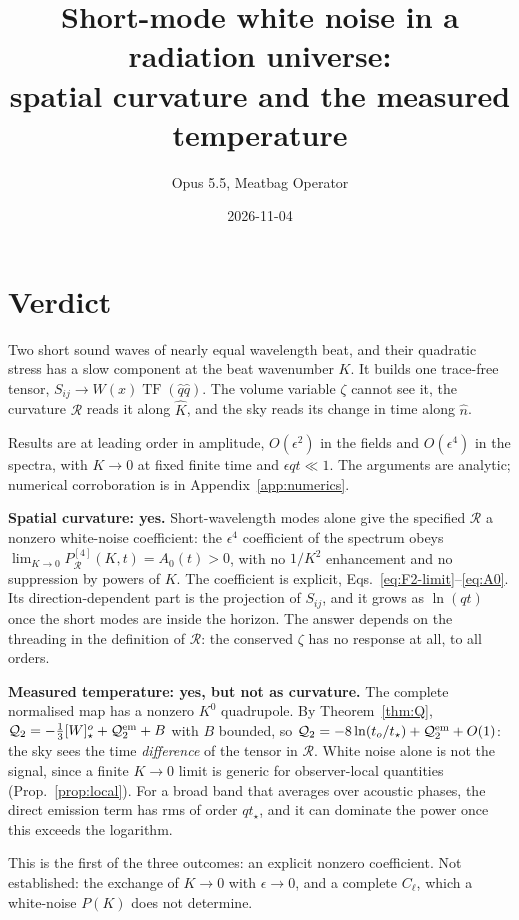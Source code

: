 \documentclass[10pt]{article}
\title{Short-mode white noise in a radiation universe:\\ spatial curvature and the measured temperature}
\author{Opus 5.5, Meatbag Operator}
\date{2026-11-04}
\newcommand{\eps}{\epsilon}
\newcommand{\nh}{\hat n}
\newcommand{\TF}{\operatorname{TF}}
\newcommand{\Q}{\mathcal Q_2}
\newcommand{\R}{\mathcal R}
\newcommand{\Kh}{\hat K}
\newcommand{\qh}{\hat q}
\begin{document}
\maketitle

\section*{Verdict}

Two short sound waves of nearly equal wavelength beat, and their quadratic stress has a slow component at the beat wavenumber $K$. It builds one trace-free tensor, $S_{ij}\to W(x)\TF(\qh\qh)$. The volume variable $\zeta$ cannot see it, the curvature $\R$ reads it along $\Kh$, and the sky reads its change in time along $\nh$.

Results are at leading order in amplitude, $O(\eps^2)$ in the fields and $O(\eps^4)$ in the spectra, with $K\to0$ at fixed finite time and $\eps qt\ll1$. The arguments are analytic; numerical corroboration is in Appendix~\ref{app:numerics}.

\textbf{Spatial curvature: yes.} Short-wavelength modes alone give the specified $\R$ a nonzero white-noise coefficient: the $\eps^4$ coefficient of the spectrum obeys $\lim_{K\to0}P_\R^{[4]}(K,t)=A_0(t)>0$, with no $1/K^2$ enhancement and no suppression by powers of $K$. The coefficient is explicit, Eqs.~\eqref{eq:F2-limit}--\eqref{eq:A0}. Its direction-dependent part is the projection of $S_{ij}$, and it grows as $\ln(qt)$ once the short modes are inside the horizon. The answer depends on the threading in the definition of $\R$: the conserved $\zeta$ has no response at all, to all orders.

\textbf{Measured temperature: yes, but not as curvature.} The complete normalised map has a nonzero $K^0$ quadrupole. By Theorem~\ref{thm:Q}, $\Q=-\frac13[W]^{o}_{\star}+\Q^{\rm em}+B$ with $B$ bounded, so $\Q=-8\ln(t_o/t_\star)+\Q^{\rm em}+O(1)$: the sky sees the time \emph{difference} of the tensor in $\R$. White noise alone is not the signal, since a finite $K\to0$ limit is generic for observer-local quantities (Prop.~\ref{prop:local}). For a broad band that averages over acoustic phases, the direct emission term has rms of order $qt_\star$, and it can dominate the power once this exceeds the logarithm.

This is the first of the three outcomes: an explicit nonzero coefficient. Not established: the exchange of $K\to0$ with $\eps\to0$, and a complete $C_\ell$, which a white-noise $P(K)$ does not determine.
\end{document}
